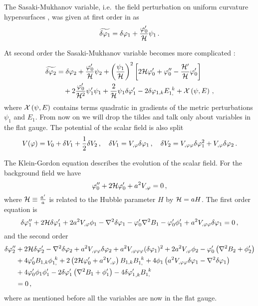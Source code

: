 The Sasaki-Mukhanov variable, i.e.\ the field perturbation on uniform curvature
hypersurfaces \cite{Sasaki:1986hm,Mukhanov:1988jd}, was given at first order in
 as
%  
\begin{equation}
\label{eq:Q1I-num}
\widetilde{\delta\varphi_{1}}=\delta\varphi_{1}+\frac{\varphi_{0}'}{\mathcal{H}}\psi_1\,.
\end{equation}
% 

% 
At second order the Sasaki-Mukhanov variable becomes more complicated
\cite{Malik:2005cy,Malik:2003mv}:
% 
\begin{align}
\label{eq:Q2I-num}
\widetilde{\delta\varphi_{2}} &= \delta\varphi_{2}+\frac{\varphi_{0}'}{\mathcal{H}}\psi_2
+\left(\frac{\psi_1}{\mathcal{H}}\right)^2\left[
2\mathcal{H}\varphi_{0}'+\varphi_{0}''-\frac{\mathcal{H}'}{\mathcal{H}}\varphi_{0}'\right] \nonumber\\
& \quad +2\frac{\varphi_{0}'}{\mathcal{H}^2}\psi_1'\psi_1+\frac{2}{\mathcal{H}}\psi_1\delta\varphi_{1}'
-2\delta\varphi_{1,k}E_{1,}^{~k}
+{\cal{X}}\left(\psi,E\right)\,,
\end{align}
% 
where ${\cal{X}}\left(\psi,E\right)$ contains terms quadratic in
gradients of the metric perturbations $\psi_1$ and $E_1$. From now on we will
drop the tildes and talk only about variables in the flat gauge.
The potential of the scalar field is also split
% 
\begin{equation}
 V(\varphi) = V_{0} + \delta V_{1} + \frac{1}{2}\delta V _{2}\,,\quad
 \delta V_{1} = V_{,\varphi} \delta\varphi_{1} \,,\quad
 \delta V_{2} = V_{,\varphi\varphi} \delta\varphi_{1}^2 + V_{,\varphi}\delta\varphi_{2} \,.
\end{equation}
% 


The Klein-Gordon equation describes the evolution of the scalar field. For the
background field we have
%
\begin{equation}
\label{eq:KGback-num}
\varphi_{0}''+2\mathcal{H}\varphi_{0}'+a^2 V_{,\varphi} = 0\,,   
\end{equation}
%
where $\mathcal{H}\equiv\frac{a'}{a}$ is related to the Hubble parameter $H$ by $\mathcal{H}=aH$.
% 
The first order equation is
%
\begin{equation}
\label{eq:KGflatsingle-num}
\delta\varphi_{1}''+2\mathcal{H}\delta\varphi_{1}'+2a^2 V_{,\varphi} \phi_1
-\nabla^2\delta\varphi_{1}-\varphi_{0}'\nabla^2 B_1
-\varphi_{0}'\phi'_1 + a^2 V_{,\varphi\varphi} \delta\varphi_{1}
=0\,,
\end{equation}
%
and the second order
%
\begin{align}
\label{eq:KG2flatsingle-num}
\dvp2'' &+ 2\H\dvp2'-\nabla^2\dvp2+a^2 \Upp \dvp2
+ a^2 \Uppp (\dvp1)^2 +2a^2 \Uphi \phi_2
-\vp_{0}'\left(\nabla^2 B_2+\phi_2'\right)\nonumber\\
%
&+ 4\vp_{0}' B_{1,k}\phi_{1,}^{~k}
+2\left(2\H\vp_{0}'+a^2 \Uphi\right) B_{1,k}B_{1,}^{~k}
+4\phi_1\left(a^2 \Upp \dvp1-\nabla^2\dvp1\right) \nonumber\\
&+ 4\vp_{0}'\phi_1\phi_1'
-2\dvp1'\left(\nabla^2 B_1+\phi_1'\right)-4{\dvp1'}_{,k}B_{1,}^{~k} \nonumber \\
&= 0\,,
\end{align}
% 
where as mentioned before all the variables are now in the flat gauge.


